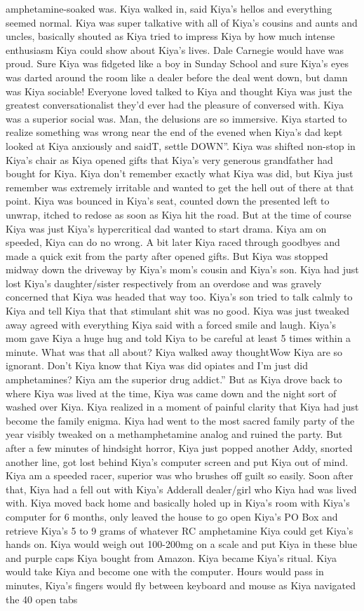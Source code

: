 \documentclass[12pt]{book}
\begin{document}
amphetamine-soaked was. Kiya walked in, said Kiya's hellos and everything seemed normal. Kiya was super talkative with all of Kiya's cousins and aunts and uncles, basically shouted as Kiya tried to impress Kiya by how much intense enthusiasm Kiya could show about Kiya's lives. Dale Carnegie would have was proud. Sure Kiya was fidgeted like a boy in Sunday School and sure Kiya's eyes was darted around the room like a dealer before the deal went down, but damn was Kiya sociable! Everyone loved talked to Kiya and thought Kiya was just the greatest conversationalist they'd ever had the pleasure of conversed with. Kiya was a superior social was. Man, the delusions are so immersive. Kiya started to realize something was wrong near the end of the evened when Kiya's dad kept looked at Kiya anxiously and saidT, settle DOWN''. Kiya was shifted non-stop in Kiya's chair as Kiya opened gifts that Kiya's very generous grandfather had bought for Kiya. Kiya don't remember exactly what Kiya was did, but Kiya just remember was extremely irritable and wanted to get the hell out of there at that point. Kiya was bounced in Kiya's seat, counted down the presented left to unwrap, itched to redose as soon as Kiya hit the road. But at the time of course Kiya was just Kiya's hypercritical dad wanted to start drama. Kiya am on speeded, Kiya can do no wrong. A bit later Kiya raced through goodbyes and made a quick exit from the party after opened gifts. But Kiya was stopped midway down the driveway by Kiya's mom's cousin and Kiya's son. Kiya had just lost Kiya's daughter/sister respectively from an overdose and was gravely concerned that Kiya was headed that way too. Kiya's son tried to talk calmly to Kiya and tell Kiya that that stimulant shit was no good. Kiya was just tweaked away agreed with everything Kiya said with a forced smile and laugh. Kiya's mom gave Kiya a huge hug and told Kiya to be careful at least 5 times within a minute. What was that all about? Kiya walked away thoughtWow Kiya are so ignorant. Don't Kiya know that Kiya was did opiates and I'm just did amphetamines? Kiya am the superior drug addict.'' But as Kiya drove back to where Kiya was lived at the time, Kiya was came down and the night sort of washed over Kiya. Kiya realized in a moment of painful clarity that Kiya had just become the family enigma. Kiya had went to the most sacred family party of the year visibly tweaked on a methamphetamine analog and ruined the party. But after a few minutes of hindsight horror, Kiya just popped another Addy, snorted another line, got lost behind Kiya's computer screen and put Kiya out of mind. Kiya am a speeded racer, superior was who brushes off guilt so easily. Soon after that, Kiya had a fell out with Kiya's Adderall dealer/girl who Kiya had was lived with. Kiya moved back home and basically holed up in Kiya's room with Kiya's computer for 6 months, only leaved the house to go open Kiya's PO Box and retrieve Kiya's 5 to 9 grams of whatever RC amphetamine Kiya could get Kiya's hands on. Kiya would weigh out 100-200mg on a scale and put Kiya in these blue and purple caps Kiya bought from Amazon. Kiya became Kiya's ritual. Kiya would take Kiya and become one with the computer. Hours would pass in minutes, Kiya's fingers would fly between keyboard and mouse as Kiya navigated the 40 open tabs 
\end{document}
